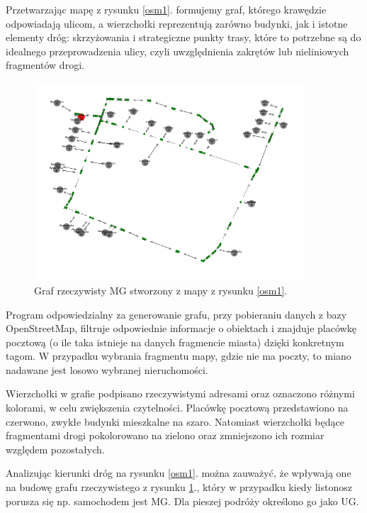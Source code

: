 \documentclass[a4paper, 12pt, twoside, openright]{article}
\begin{document}

	Przetwarzając mapę z rysunku \ref{osm1}. formujemy graf, którego krawędzie odpowiadają ulicom, a wierzchołki reprezentują zarówno budynki, jak i istotne elementy dróg: skrzyżowania i strategiczne punkty trasy, które to potrzebne są do idealnego przeprowadzenia ulicy, czyli uwzględnienia zakrętów lub nieliniowych fragmentów drogi.

	\begin{figure}[htb]
		\centering
		\includegraphics[width=0.9\textwidth]{OSM1graf}
		\caption[]{Graf rzeczywisty MG stworzony z mapy z rysunku \ref{osm1}.}
		\label{osm1G}
	\end{figure}
	
	Program odpowiedzialny za generowanie grafu, przy pobieraniu danych z bazy OpenStreetMap, filtruje odpowiednie informacje o obiektach i znajduje placówkę pocztową (o ile taka istnieje na danych fragmencie miasta) dzięki konkretnym tagom\cite{osmPropertis}. W przypadku wybrania fragmentu mapy, gdzie nie ma poczty, to miano nadawane jest losowo wybranej nieruchomości.
	
	Wierzchołki w grafie podpisano rzeczywistymi adresami oraz oznaczono różnymi kolorami, w celu zwiększenia czytelności. Placówkę pocztową przedstawiono na czerwono, zwykłe budynki mieszkalne na szaro. Natomiast wierzchołki będące fragmentami drogi pokolorowano na zielono oraz zmniejszono ich rozmiar względem pozostałych.
	
	Analizując kierunki dróg na rysunku \ref{osm1}. można zauważyć, że wpływają one na budowę grafu rzeczywistego z rysunku \ref{osm1G}., który w przypadku kiedy listonosz porusza się np. samochodem jest MG. Dla pieszej podróży  określono go jako UG.
\end{document}
